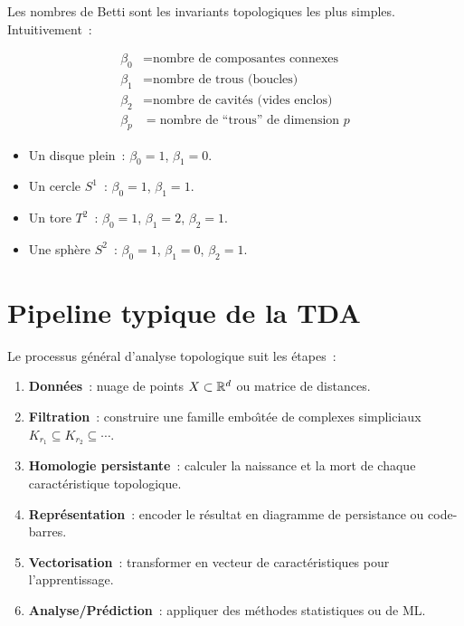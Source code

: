 Les nombres de Betti sont les invariants topologiques les plus simples.
Intuitivement~:

\begin{formules}[title=\textbf{Nombres de Betti}]
\begin{align}
\beta_0 &= \text{nombre de composantes connexes} \\
\beta_1 &= \text{nombre de trous (boucles)} \\
\beta_2 &= \text{nombre de cavit\'es (vides enclos)} \\
\beta_p &= \text{nombre de ``trous'' de dimension } p
\end{align}
\end{formules}

\begin{exemple}
\begin{itemize}
  \item Un disque plein~: $\beta_0 = 1$, $\beta_1 = 0$.
  \item Un cercle $S^1$~: $\beta_0 = 1$, $\beta_1 = 1$.
  \item Un tore $T^2$~: $\beta_0 = 1$, $\beta_1 = 2$, $\beta_2 = 1$.
  \item Une sph\`ere $S^2$~: $\beta_0 = 1$, $\beta_1 = 0$,
        $\beta_2 = 1$.
\end{itemize}
\end{exemple}

\section{Pipeline typique de la TDA}

Le processus g\'en\'eral d'analyse topologique suit les \'etapes~:

\begin{algorithme}[title=\textbf{Pipeline TDA standard}]
\begin{enumerate}
  \item \textbf{Donn\'ees}~: nuage de points $X \subset \mathbb{R}^d$ ou
        matrice de distances.
  \item \textbf{Filtration}~: construire une famille embo\^{\i}t\'ee de
        complexes simpliciaux $K_{r_1} \subseteq K_{r_2} \subseteq \cdots$.
  \item \textbf{Homologie persistante}~: calculer la naissance et la
        mort de chaque caract\'eristique topologique.
  \item \textbf{Repr\'esentation}~: encoder le r\'esultat en diagramme de
        persistance ou code-barres.
  \item \textbf{Vectorisation}~: transformer en vecteur de
        caract\'eristiques pour l'apprentissage.
  \item \textbf{Analyse/Pr\'ediction}~: appliquer des m\'ethodes
        statistiques ou de ML.
\end{enumerate}
\end{algorithme}


